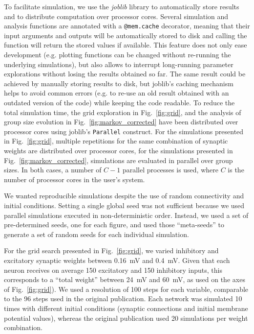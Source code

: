 \documentclass[10pt,a4paper,onecolumn]{article}
\begin{document}
To facilitate simulation, we use the \emph{joblib} library to automatically store results and to distribute computation over processor cores. Several simulation and analysis functions are annotated with a \verb|@mem.cache| decorator, meaning that their input arguments and outputs will be automatically stored to disk and calling the function will return the stored values if available. This feature does not only ease development (e.g. plotting functions can be changed without re-running the underlying simulations), but also allows to interrupt long-running parameter explorations without losing the results obtained so far. The same result could be achieved by manually storing results to disk, but joblib's caching mechanism helps to avoid common errors (e.g. to re-use an old result obtained with an outdated version of the code) while keeping the code readable. To reduce the total simulation time, the grid exploration in Fig.~\ref{fig:grid}, and the analysis of group size evolution in Fig.~\ref{fig:markov_corrected} have been distributed over processor cores using joblib's \verb|Parallel| construct. For the simulations presented in Fig.~\ref{fig:grid}, multiple repetitions for the same combination of synaptic weights are distributed over processor cores, for the simulations presented in Fig.~\ref{fig:markov_corrected}, simulations are evaluated in parallel over group sizes. In both cases, a number of $C-1$ parallel processes is used, where $C$ is the number of processor cores in the user's system.

We wanted reproducible simulations despite the use of random connectivity and initial conditions. Setting a single global seed was not sufficient because we used parallel simulations executed in non-deterministic order. Instead, we used a set of pre-determined seeds, one for each figure, and used those ``meta-seeds'' to generate a set of random seeds for each individual simulation.

For the grid search presented in Fig.~\ref{fig:grid}, we varied inhibitory and excitatory synaptic weights between \SI{0.16}{\milli\volt} and \SI{0.4}{\milli\volt}. Given that each neuron receives on average 150 excitatory and 150 inhibitory inputs, this corresponds to a ``total weight'' between \SI{24}{\milli\volt} and \SI{60}{\milli\volt}, as used on the axes of Fig.~\ref{fig:grid}). We used a resolution of 100 steps for each variable, comparable to the 96 steps used in the original publication. Each network was simulated 10 times with different initial conditions (synaptic connections and initial membrane potential values), whereas the original publication used 20 simulations per weight combination.
\end{document}
